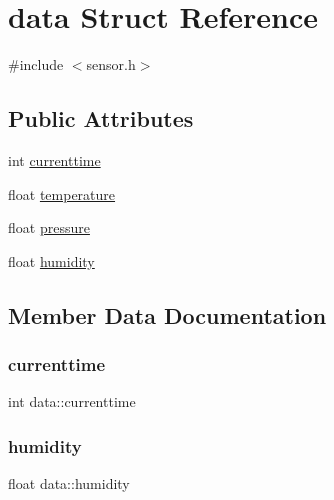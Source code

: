 \hypertarget{structdata}{}\section{data Struct Reference}
\label{structdata}


{\ttfamily \#include $<$sensor.\+h$>$}

\subsection*{Public Attributes}
\begin{DoxyCompactItemize}
\item 
int \hyperlink{structdata_ab041cff3ed545724b9157b87eaac1a08}{currenttime}
\item 
float \hyperlink{structdata_a92d573d048b933148a65e445b20df3b9}{temperature}
\item 
float \hyperlink{structdata_a6382da4e622ddd126cdc26169531e69f}{pressure}
\item 
float \hyperlink{structdata_a48291e0075fe9ab86708780888227e65}{humidity}
\end{DoxyCompactItemize}


\subsection{Member Data Documentation}
\mbox{\label{structdata_ab041cff3ed545724b9157b87eaac1a08}} 
\subsubsection{\texorpdfstring{currenttime}{currenttime}}
{\footnotesize\ttfamily int data\+::currenttime}

\mbox{\label{structdata_a48291e0075fe9ab86708780888227e65}} 
\subsubsection{\texorpdfstring{humidity}{humidity}}
{\footnotesize\ttfamily float data\+::humidity}

\mbox{\label{structdata_a6382da4e622ddd126cdc26169531e69f}} 
